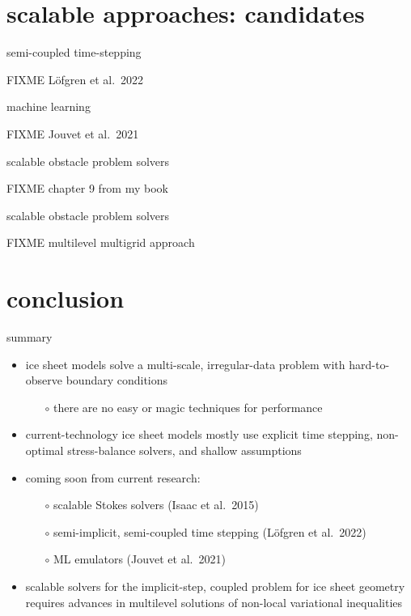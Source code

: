 \documentclass[svgnames,
               hyperref={colorlinks,citecolor=DeepPink4,linkcolor=FireBrick,urlcolor=Maroon},
               usepdftitle=false]  %
               {beamer}
\begin{document}
\section{scalable approaches: candidates}

\begin{frame}{semi-coupled time-stepping}

FIXME L{\"o}fgren et al.~2022
\end{frame}

\begin{frame}{machine learning}

FIXME Jouvet et al.~2021
\end{frame}

\begin{frame}{scalable obstacle problem solvers}

FIXME chapter 9 from my book
\end{frame}

\begin{frame}{scalable obstacle problem solvers}

FIXME multilevel multigrid approach
\end{frame}


\section{conclusion}

\begin{frame}{\alert{summary}}

\begin{itemize}
\item ice sheet models solve a multi-scale, irregular-data problem with hard-to-observe boundary conditions
   \begin{itemize}
   \item[$\circ$] there are \alert{no easy or magic techniques} for performance
   \end{itemize}
\item<2-> current-technology ice sheet models mostly use \alert{explicit} time stepping, \alert{non-optimal} stress-balance solvers, and \alert{shallow} assumptions
\item<3-> \alert{coming soon} from current research:
   \begin{itemize}
   \item[$\circ$] scalable Stokes solvers (Isaac et al.~2015)
   \item[$\circ$] semi-implicit, semi-coupled time stepping (L{\"o}fgren et al.~2022)
   \item[$\circ$] ML emulators (Jouvet et al.~2021)
   \end{itemize}
\item<4-> scalable solvers for the implicit-step, coupled problem for ice sheet geometry requires advances in \alert{multilevel solutions of non-local variational inequalities}
\end{itemize}
\end{frame}
\end{document}
